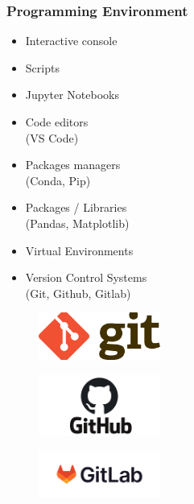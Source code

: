 \begin{frame}\frametitle{Programming Environment}

   \begin{minipage}{0.48\linewidth}
      \begin{itemize}
         \item Interactive console   
         \item Scripts
         \item Jupyter Notebooks
         \item Code editors\\(VS Code)
         \item Packages managers\\(Conda, Pip)
         \item Packages / Libraries\\(Pandas, Matplotlib)
         \item Virtual Environments
         \item Version Control Systems\\(Git, Github, Gitlab)
      \end{itemize}
   \end{minipage}
   \begin{minipage}{0.5\linewidth}
      \begin{figure}[H]
         \includegraphics[width=4cm]{../images/illustrations/git.png}
      \end{figure}
      \begin{figure}[H]
         \includegraphics[width=4cm]{../images/illustrations/github.png}
      \end{figure}
      \begin{figure}[H]
         \includegraphics[width=4cm]{../images/illustrations/gitlab.png}
      \end{figure}
   \end{minipage}
\end{frame}


